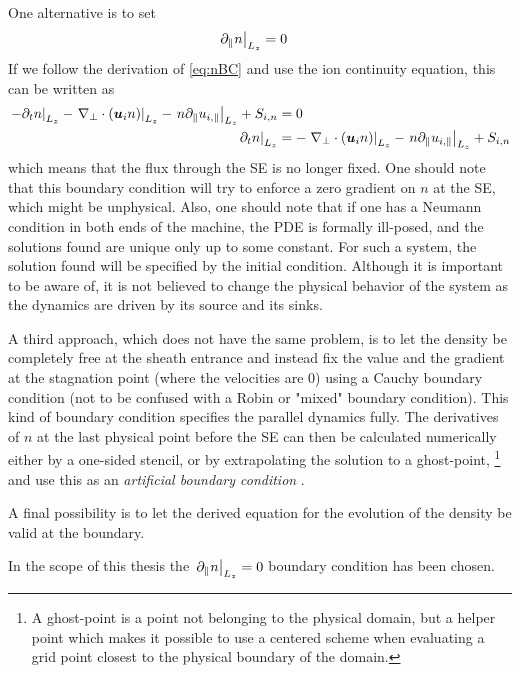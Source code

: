 One alternative is to set
%
\begin{align*}
    \left. \partial_\| n \right|_{L_z} &= 0
\end{align*}
%
If we follow the derivation of \cref{eq:nBC} and use the ion continuity equation, this can be written as
%
\begin{align*}
    \left.- \partial_tn \right|_{L_z}- \left.\nabla_\perp\cdot\left(\boldsymbol{u}_{i} n \right)\right|_{L_z}
    -\left.n \partial_\| u_{i,\|}\right|_{L_z} + S_{i,n}
    &= 0\\
    \left.\partial_tn \right|_{L_z}&=  - \left.\nabla_\perp\cdot\left(\boldsymbol{u}_{i} n \right)\right|_{L_z}-
    \left.n \partial_\| u_{i,\|}\right|_{L_z} + S_{i,n}
\end{align*}
%
which means that the flux through the SE is no longer fixed.
One should note that this boundary condition will try to enforce a zero gradient on $n$ at the SE, which might be unphysical.
Also, one should note that if one has a Neumann condition in both ends of the machine, the PDE is formally ill-posed, and the solutions found are unique only up to some constant.
For such a system, the solution found will be specified by the initial condition.
Although it is important to be aware of, it is not believed to change the physical behavior of the system as the dynamics are driven by its source and its sinks.

A third approach, which does not have the same problem, is to let the density be completely free at the sheath entrance and instead fix the value and the gradient at the stagnation point (where the velocities are $0$) using a Cauchy boundary condition (not to be confused with a Robin or "mixed" boundary condition).
This kind of boundary condition specifies the parallel dynamics fully.
The derivatives of $n$ at the last physical point before the SE can then be calculated numerically either by a one-sided stencil, or by extrapolating the solution to a ghost-point,%
%
\footnote{A ghost-point is a point not belonging to the physical domain, but a helper point which makes it possible to use a centered scheme when evaluating a grid point closest to the physical boundary of the domain.}
%
and use this as an \emph{artificial boundary condition} \cite{Leveque2007book}.

A final possibility is to let the derived equation for the evolution of the density be valid at the boundary.

In the scope of this thesis the $\left. \partial_\| n \right|_{L_z} = 0$ boundary condition has been chosen.

